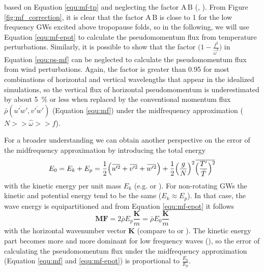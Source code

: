 based on Equation \ref{equ:mf-tp} and neglecting the factor $\textrm{A} \, \textrm{B}$ (\cite[]{ern_gracile_2018}, \cite*[]{ern_intermittency_2022}). From Figure \ref{fig:mf_correction}, it is clear that the factor $\textrm{A} \, \textrm{B}$ is close to 1 for the low frequency GWs excited above tropopause folds, so in the following, we will use Equation \ref{equ:mf-epot} to calculate the pseudomomentum flux from temperature perturbations. Similarly, it is possible to show that the factor $\bigl(1-\frac{f^2}{\hat{\omega}^2}\bigr)$ in Equation \ref{equ:ps-mf} can be neglected to calculate the pseudomomentum flux from wind perturbations. Again, the factor is greater than 0.95 for most combinations of horizontal and vertical wavelengths that appear in the idealized simulations, so the vertical flux of horizontal pseudomomentum is underestimated by about \SI{5}{\percent} or less when replaced by the conventional momentum flux $\bar{\rho}(\overbar{u'w'},\overbar{v'w'})$ (Equation \ref{equ:mf}) under the midfrequency approximation ($N >> \hat{\omega} >> f$).

For a broader understanding we can obtain another perspective on the error of the midfrequency approximation by introducing the total energy
\begin{equation}
    E_0 = E_k + E_p = \frac{1}{2} \Bigl(\overbar{u'^2} + \overbar{v'^2} + \overbar{w'^2}\Bigr) + \frac{1}{2} \Bigl(\frac{g}{N}\Bigr)^2 \overbar{\Bigl(\frac{T'}{\bar{T}}\Bigr)^2}
    \label{equ:etot}
\end{equation}
with the kinetic energy per unit mass $E_k$ (e.g. \cite[]{gill_atmosphere-ocean_1982} or \cite[]{tsuda_global_2000}). For non-rotating GWs the kinetic and potential energy tend to be the same ($ E_k \approx E_p$). In that case, the wave energy is equipartitioned and from Equation \ref{equ:mf-epot} it follows
\begin{equation}
    \mathbf{MF} = 2 \bar{\rho} E_p \frac{\mathbf{K}}{m} = \bar{\rho} E_{0} \frac{\mathbf{K}}{m}
    \label{equ:mf-etot}
\end{equation}
with the horizontal wavenumber vector $\mathbf{K}$ (compare to \cite[]{andrews_wave-action_1978} or \cite[]{fritts_gravity_2003}). The kinetic energy part becomes more and more dominant for low frequency waves (\cite[]{gill_atmosphere-ocean_1982}), so the error of calculating the pseudomomentum flux under the midfrequency approximation (Equation \ref{equ:mf} and \ref{equ:mf-epot}) is proportional to $\frac{E_k}{E_p}$.  

